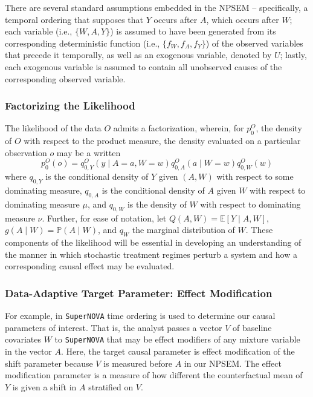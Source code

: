 \documentclass[
]{article}
\begin{document}
There are several standard assumptions embedded in the NPSEM --
specifically, a temporal ordering that supposes that \(Y\) occurs after
\(A\), which occurs after \(W\); each variable (i.e., \(\{W, A, Y\}\))
is assumed to have been generated from its corresponding deterministic
function (i.e., \(\{f_W, f_A, f_Y\}\)) of the observed variables that
precede it temporally, as well as an exogenous variable, denoted by
\(U\); lastly, each exogenous variable is assumed to contain all
unobserved causes of the corresponding observed variable.

\hypertarget{factorizing-the-likelihood}{%
\subsubsection{Factorizing the
Likelihood}\label{factorizing-the-likelihood}}

The likelihood of the data \(O\) admits a factorization, wherein, for
\(p_0^O\), the density of \(O\) with respect to the product measure, the
density evaluated on a particular observation \(o\) may be a written
\begin{equation}
  p_0^O(o) = q^O_{0,Y}(y \mid A = a, W = w) q^O_{0,A}(a \mid W = w)
  q^O_{0,W}(w)
\end{equation} where \(q_{0, Y}\) is the conditional density of \(Y\)
given \((A, W)\) with respect to some dominating measure, \(q_{0, A}\)
is the conditional density of \(A\) given \(W\) with respect to
dominating measure \(\mu\), and \(q_{0, W}\) is the density of \(W\)
with respect to dominating measure \(\nu\). Further, for ease of
notation, let \(Q(A, W) = \mathbb{E}[Y \mid A, W]\),
\(g(A \mid W) = \mathbb{P}(A \mid W)\), and \(q_W\) the marginal
distribution of \(W\). These components of the likelihood will be
essential in developing an understanding of the manner in which
stochastic treatment regimes perturb a system and how a corresponding
causal effect may be evaluated.

\hypertarget{data-adaptive-target-parameter-effect-modification}{%
\subsubsection{Data-Adaptive Target Parameter: Effect
Modification}\label{data-adaptive-target-parameter-effect-modification}}

For example, in \texttt{SuperNOVA} time ordering is used to determine
our causal parameters of interest. That is, the analyst passes a vector
\(V\) of baseline covariates \(W\) to \texttt{SuperNOVA} that may be
effect modifiers of any mixture variable in the vector \(A\). Here, the
target causal parameter is effect modification of the shift parameter
because \(V\) is measured before \(A\) in our NPSEM. The effect
modification parameter is a measure of how different the counterfactual
mean of \(Y\) is given a shift in \(A\) stratified on \(V\).
\end{document}
